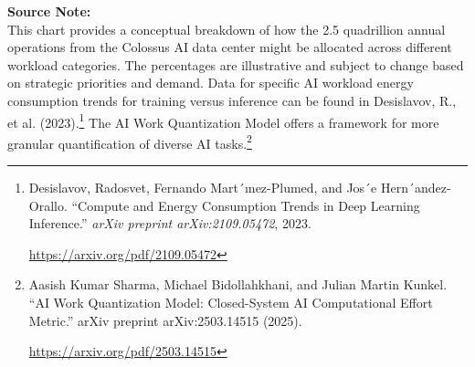 \documentclass[fontsize=10pt, oneside, DIV=calc]{scrartcl}
\begin{document}
\noindent\footnotesize
\textbf{Source Note:}\\[0.5em]
This chart provides a conceptual breakdown of how the 2.5 quadrillion annual operations from the Colossus AI data center might be allocated across different workload categories. The percentages are illustrative and subject to change based on strategic priorities and demand. Data for specific AI workload energy consumption trends for training versus inference can be found in Desislavov, R., et al. (2023).\footnote{Desislavov, Radosvet, Fernando Mart´ınez-Plumed, and Jos´e Hern´andez-Orallo. ``Compute and Energy Consumption Trends in Deep Learning Inference.'' \textit{arXiv preprint arXiv:2109.05472}, 2023. 







\href{https://arxiv.org/pdf/2109.05472}\url{https://arxiv.org/pdf/2109.05472}} The AI Work Quantization Model offers a framework for more granular quantification of diverse AI tasks.\footnote{Aasish Kumar Sharma, Michael Bidollahkhani, and Julian Martin Kunkel. ``AI Work Quantization Model: Closed-System AI Computational Effort Metric.'' arXiv preprint arXiv:2503.14515 (2025). 







\href{https://arxiv.org/pdf/2503.14515}\url{https://arxiv.org/pdf/2503.14515}}
\end{document}

